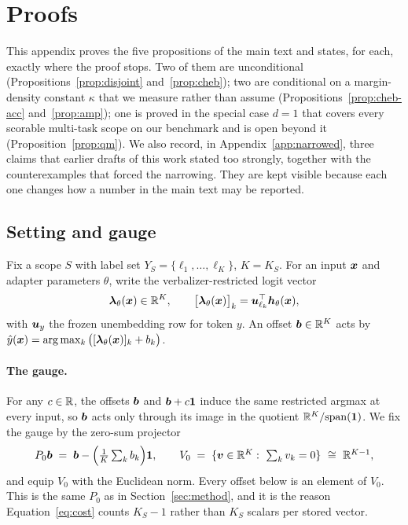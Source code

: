 \section{Proofs}
\label{app:proofs}

This appendix proves the five propositions of the main text and states, for each,
exactly where the proof stops. Two of them are unconditional
(Propositions~\ref{prop:disjoint} and~\ref{prop:cheb}); two are conditional on a
margin-density constant $\kappa$ that we measure rather than assume
(Propositions~\ref{prop:cheb-acc} and~\ref{prop:amp}); one is proved in the
special case $d=1$ that covers every scorable multi-task scope on our benchmark
and is open beyond it (Proposition~\ref{prop:qm}). We also record, in
Appendix~\ref{app:narrowed}, three claims that earlier drafts of this work stated
too strongly, together with the counterexamples that forced the narrowing. They
are kept visible because each one changes how a number in the main text may be
reported.

\subsection{Setting and gauge}
\label{app:gauge}

Fix a scope $S$ with label set $Y_S=\{\ell_1,\dots,\ell_{K}\}$, $K=K_S$. For an
input $\bm{x}$ and adapter parameters $\theta$, write the verbalizer-restricted logit
vector
\begin{equation}
  \bm{\lambda}_\theta(\bm{x})\in\mathbb{R}^{K},
  \qquad
  \big[\bm{\lambda}_\theta(\bm{x})\big]_k = \bm{u}_{\ell_k}^\top\bm{h}_\theta(\bm{x}),
  \label{eq:app-logit}
\end{equation}
with $\bm{u}_y$ the frozen unembedding row for token $y$. An offset $\bm{b}\in\mathbb{R}^{K}$
acts by $\hat y(\bm{x})=\arg\max_k\big([\bm{\lambda}_\theta(\bm{x})]_k+b_k\big)$.

\paragraph{The gauge.}
For any $c\in\mathbb{R}$, the offsets $\bm{b}$ and $\bm{b}+c\mathbf{1}$ induce the same
restricted argmax at every input, so $\bm{b}$ acts only through its image in the
quotient $\mathbb{R}^{K}/\mathrm{span}(\mathbf{1})$. We fix the gauge by the zero-sum
projector
\begin{equation}
  P_0\bb \;=\; \bb - \Big(\tfrac{1}{K}\textstyle\sum_k b_k\Big)\mathbf{1},
  \qquad
  V_0 \;=\; \{\bm{v}\in\R^{K}:\ \textstyle\sum_k v_k = 0\}\ \cong\ \R^{K-1},
  \label{eq:app-gauge}
\end{equation}
and equip $V_0$ with the Euclidean norm. Every offset below is an element of
$V_0$. This is the same $P_0$ as in Section~\ref{sec:method}, and it is the reason
Equation~\eqref{eq:cost} counts $K_S-1$ rather than $K_S$ scalars per stored
vector.


